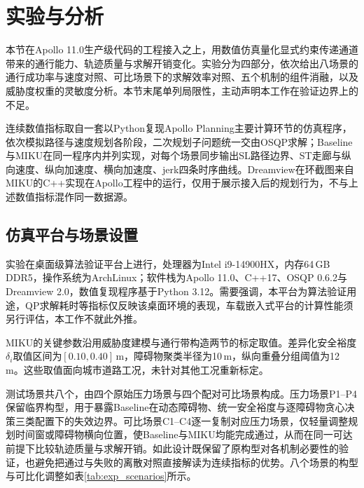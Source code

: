 \documentclass[a4paper,11pt]{ctexart}
\theoremstyle{definition}
\begin{document}
\section{实验与分析}
\label{sec:experiment}

本节在Apollo 11.0生产级代码的工程接入之上，用数值仿真量化显式约束传递通道带来的通行能力、轨迹质量与求解开销变化。实验分为四部分，依次给出八场景的通行成功率与速度对照、可比场景下的求解效率对照、五个机制的组件消融，以及威胁度权重的灵敏度分析。本节末尾单列局限性，主动声明本工作在验证边界上的不足。

连续数值指标取自一套以Python复现Apollo Planning主要计算环节的仿真程序，依次模拟路径与速度规划各阶段，二次规划子问题统一交由OSQP求解；Baseline与MIKU在同一程序内并列实现，对每个场景同步输出SL路径边界、ST走廊与纵向速度、纵向加速度、横向加速度、jerk四条时序曲线。Dreamview在环截图来自MIKU的C++实现在Apollo工程中的运行，仅用于展示接入后的规划行为，不与上述数值指标混作同一数据源。

\subsection{仿真平台与场景设置}
\label{subsec:exp_setup}

实验在桌面级算法验证平台上进行，处理器为Intel i9-14900HX，内存64\,GB DDR5，操作系统为ArchLinux；软件栈为Apollo 11.0、C++17、OSQP 0.6.2与Dreamview 2.0，数值复现程序基于Python 3.12。需要强调，本平台为算法验证用途，QP求解耗时等指标仅反映该桌面环境的表现，车载嵌入式平台的计算性能须另行评估，本工作不就此外推。

MIKU的关键参数沿用威胁度建模与通行带构造两节的标定取值。差异化安全裕度$\delta_i$取值区间为$[0.10, 0.40]$\,m，障碍物聚类半径为10\,m，纵向重叠分组阈值为12\,m。这些取值面向城市道路工况，未针对其他工况重新标定。

测试场景共八个，由四个原始压力场景与四个配对可比场景构成。压力场景P1--P4保留临界构型，用于暴露Baseline在动态障碍物、统一安全裕度与逐障碍物贪心决策三类配置下的失效边界。可比场景C1--C4逐一复制对应压力场景，仅轻量调整规划时间窗或障碍物横向位置，使Baseline与MIKU均能完成通过，从而在同一可达前提下比较轨迹质量与求解开销。如此设计既保留了原构型对各机制必要性的验证，也避免把通过与失败的离散对照直接解读为连续指标的优势。八个场景的构型与可比化调整如表\ref{tab:exp_scenarios}所示。
\end{document}
